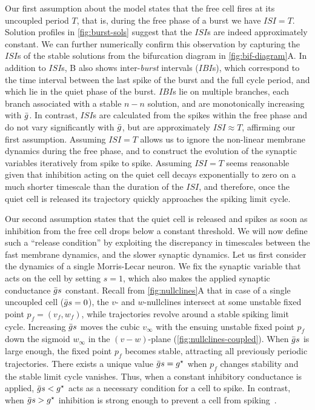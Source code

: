 \documentclass[../manuscript.tex]{subfiles}
\begin{document}
Our first assumption about the model states that the free cell fires at its uncoupled period $T$, that is, during the free phase of a burst we have $ISI=T$.
Solution profiles in \cref{fig:burst-sols} suggest that the $ISI$s are indeed approximately constant.
We can further numerically confirm this observation by capturing the $ISI$s of the stable solutions from the bifurcation diagram in \cref{fig:bif-diagram}A.
In addition to $ISI$s, B also shows inter-\textit{burst} intervals ($IBI$s), which correspond to the time interval between the last spike of the burst and the full cycle period, and which lie in the quiet phase of the burst.
$IBI$s lie on multiple branches, each branch associated with a stable $n-n$ solution, and are monotonically increasing with $\bar g$.
In contrast, $ISI$s are calculated from the spikes within the free phase and do not vary significantly with $\bar g$, but are approximately $ISI\approx T$, affirming our first assumption.
Assuming $ISI=T$ allows us to ignore the non-linear membrane dynamics during the free phase, and to construct the evolution of the synaptic variables iteratively from spike to spike.
Assuming $ISI=T$ seems reasonable given that inhibition acting on the quiet cell decays exponentially to zero on a much shorter timescale than the duration of the $ISI$, and therefore, once the quiet cell is released its trajectory quickly approaches the spiking limit cycle.

Our second assumption states that the quiet cell is released and spikes as soon as inhibition from the free cell drops below a constant threshold.
We will now define such a ``release condition'' by exploiting the discrepancy in timescales between the fast membrane dynamics, and the slower synaptic dynamics.
Let us first consider the dynamics of a single Morris-Lecar neuron.
We fix the synaptic variable that acts on the cell by setting $s=1$, which also makes the applied synaptic conductance $\bar g s$ constant.
Recall from \cref{fig:nullclines}A that in case of a single uncoupled cell ($\bar g s=0$), the $v$- and $w$-nullclines intersect at some unstable fixed point $p_{f}=(v_{f},w_{f})$, while trajectories revolve around a stable spiking limit cycle.
Increasing $\bar g s$ moves the cubic $v_{\infty}$ with the ensuing unstable fixed point $p_{f}$ down the sigmoid $w_{\infty}$ in the $(v-w)$-plane (\cref{fig:nullclines-coupled}).
When $\bar g s$ is large enough, the fixed point $p_{f}$ becomes stable, attracting all previously periodic trajectories.
There exists a unique value $\bar g s=g^{\star}$ when $p_{f}$ changes stability and the stable limit cycle vanishes.
Thus, when a constant inhibitory conductance is applied, $\bar g s<g^{\star}$ acts as a necessary condition for a cell to spike.
In contrast, when $\bar g s>g^{\star}$ inhibition is strong enough to prevent a cell from spiking~\citep{bose2011}.
\end{document}

